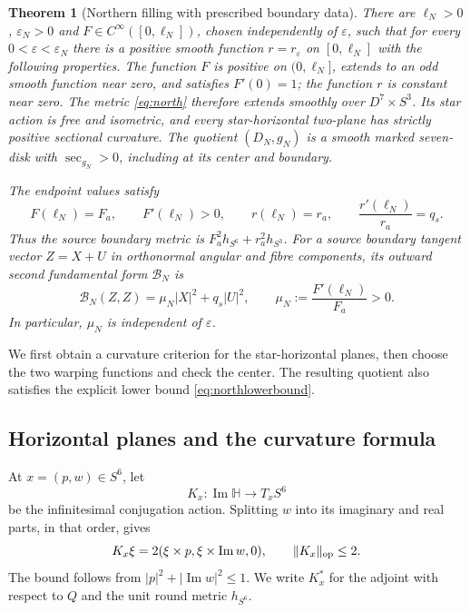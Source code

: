 \documentclass[12pt]{amsart}
\numberwithin{equation}{section}
\newtheorem{theorem}{Theorem}[section]
\theoremstyle{remark}
\newcommand{\Hh}{\mathbb H}
\newcommand{\eps}{\varepsilon}
\newcommand{\Ksec}{\operatorname{sec}}
\begin{document}
\begin{theorem}[Northern filling with prescribed boundary data]\label{thm:northfilling}
There are \(\ell_N>0\), \(\eps_N>0\) and
\(F\in C^\infty([0,\ell_N])\), chosen independently of \(\eps\),
such that for every \(0<\eps<\eps_N\) there is a positive smooth
function \(r=r_\eps\) on \([0,\ell_N]\) with the following
properties. The function \(F\) is positive on \((0,\ell_N]\),
extends to an odd smooth function near zero, and satisfies
\(F'(0)=1\); the function \(r\) is constant near zero. The metric
\eqref{eq:north} therefore extends smoothly over \(D^7\times S^3\).
Its star action is free and isometric, and every star-horizontal
two-plane has strictly positive sectional curvature. The quotient
\((D_N,g_N)\) is a smooth marked seven-disk with
\(\Ksec_{g_N}>0\), including at its center and boundary.

The endpoint values satisfy
\begin{equation}\label{eq:northendpoints}
 F(\ell_N)=F_a,\qquad F'(\ell_N)>0,\qquad
 r(\ell_N)=r_a,\qquad \frac{r'(\ell_N)}{r_a}=q_s.
\end{equation}
Thus the source boundary metric is
\(F_a^2h_{S^6}+r_a^2h_{S^3}\). For a source boundary tangent
vector \(Z=X+U\) in orthonormal angular and fibre components, its
outward second fundamental form \(\mathcal B_N\) is
\begin{equation}\label{eq:northsourceform}
 \mathcal B_N(Z,Z)=\mu_N|X|^2+q_s|U|^2,
 \qquad \mu_N:=\frac{F'(\ell_N)}{F_a}>0.
\end{equation}
In particular, \(\mu_N\) is independent of \(\eps\).
\end{theorem}

We first obtain a curvature criterion for the star-horizontal
planes, then choose the two warping functions and check the center.
The resulting quotient also satisfies the explicit lower bound
\eqref{eq:northlowerbound}.

\subsection{Horizontal planes and the curvature formula}
At \(x=(p,w)\in S^6\), let
\[
K_x:\operatorname{Im}\Hh\longrightarrow T_xS^6
\]
be the infinitesimal conjugation action. Splitting \(w\) into its
imaginary and real parts, in that order, gives
\[
K_x\xi=2(\xi\times p,\xi\times\operatorname{Im}w,0),
\qquad \|K_x\|_{\rm op}\le2.
\]
The bound follows from
\(|p|^2+|\operatorname{Im}w|^2\le1\). We write \(K_x^*\) for
the adjoint with respect to \(Q\) and the unit round metric
\(h_{S^6}\).
\end{document}
